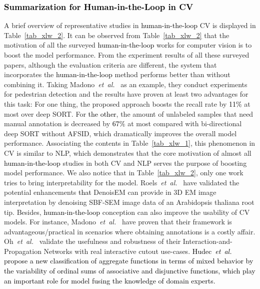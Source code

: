 \documentclass{article}
\newcommand\etal{\emph{et~al.}}
\newcommand{\REO}[1]{\textcolor{black}{#1}}
\newcommand{\ZJH}[1]{\textcolor{black}{#1}}
\begin{document}
\REO{\subsubsection{Summarization for Human-in-the-Loop in CV}}
A brief overview of representative studies in \REO{human-in-the-loop} CV is displayed in Table~\ref{tab_xlw_2}. It can be observed from Table~\ref{tab_xlw_2} that the motivation of all the surveyed \REO{human-in-the-loop} works for computer vision is to boost the model performance. From the experiment results of all these surveyed papers, although the evaluation criteria are different, the system that incorporates the \REO{human-in-the-loop} method performs better than without combining it. Taking Madono~\etal~\cite{madono2020efficient} as an example, they conduct experiments for pedestrian detection and the results have proven at least two advantages for this task: For one thing, the proposed approach boosts the recall rate by \ZJH{11$\%$} at most over deep SORT.
For \ZJH{the other}, the amount of unlabeled samples that need manual annotation is decreased by  \ZJH{67$\%$} at most compared with bi-directional deep SORT without AFSID, which dramatically improves the overall model performance. Associating the contents in Table~\ref{tab_xlw_1}, this phenomenon in CV is similar to NLP, which demonstrates that the core motivation of almost all \REO{human-in-the-loop} studies in both CV and NLP serves the purpose of boosting model performance. We also notice that in Table~\ref{tab_xlw_2}, only one work~\cite{roels2019human} tries to bring interpretability for the model. Roels~\etal~\cite{roels2019human} have validated the potential enhancements \ZJH{that} DenoisEM can provide in 3D EM image interpretation by denoising SBF-SEM image data of an Arabidopsis thaliana root tip. Besides, \REO{human-in-the-loop} conception can also improve the usability of CV models. For instance, Madono~\etal~\cite{madono2020efficient} have proven that their framework is advantageous/practical in scenarios where obtaining annotations is a costly affair. Oh~\etal~\cite{oh2019fast} validate the usefulness and robustness of their Interaction-and-Propagation Networks with real interactive cutout use-cases.
\REO{Hudec~\etal~\cite{hudec2021classification} propose a new classification of aggregate functions in terms of mixed behavior by the variability of ordinal sums of associative and disjunctive functions, which play an important role for model fusing the knowledge of domain experts.}
\end{document}
